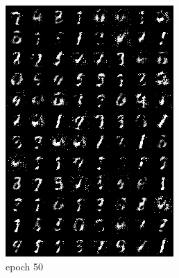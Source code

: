 \documentclass[a4paper]{article}
\theoremstyle{definition}
\newenvironment{soln}{
	\leavevmode\color{blue}\ignorespaces
}{}
\begin{document}
\begin{enumerate} [label=(\alph*)]
\begin{soln}
\begin{figure}[H]
\begin{subfigure}[b]{0.3\textwidth}
					\includegraphics[width=\textwidth]{outputs/c.gen_img50.png}
					\caption{epoch 50}
				\end{subfigure}
				\hfill
				\begin{subfigure}[b]{0.3\textwidth}
					\centering

\end{subfigure}
\end{figure}
\end{soln}
\end{enumerate}
\end{document}

